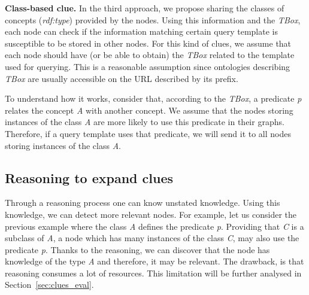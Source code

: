 \medskip

\noindent\textbf{Class-based clue.}
In the third approach, we propose sharing the classes of concepts (\textit{rdf:type}) provided by the nodes.
Using this information and the \emph{TBox}, each node can check if the information matching certain query template is susceptible to be stored in other nodes.
For this kind of clues, we assume that each node should have (or be able to obtain) the \emph{TBox} related to the template used for querying.
This is a reasonable assumption since ontologies describing \emph{TBox} are usually accessible on the URL described by its prefix.

To understand how it works, consider that, according to the \emph{TBox}, a predicate \emph{p} relates the concept \emph{A} with another concept.
We assume that the nodes storing instances of the class \emph{A} are more likely to use this predicate in their graphs.
Therefore, if a query template uses that predicate, we will send it to all nodes storing instances of the class \emph{A}.




\subsection{Reasoning to expand clues} %
Through a reasoning process one can know unstated knowledge.
Using this knowledge, we can detect more relevant nodes.
For example, let us consider the previous example where the class \emph{A} defines the predicate \emph{p}.
Providing that \emph{C} is a subclass of \emph{A}, a node which has many instances of the class \emph{C}, may also use the predicate \emph{p}.
Thanks to the reasoning, we can discover that the node has knowledge of the type \emph{A} and therefore, it may be relevant.
The drawback, is that reasoning consumes a lot of resources.
This limitation will be further analysed in Section~\ref{sec:clues_eval}.


